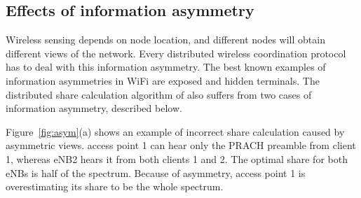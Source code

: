 \subsection{Effects of information asymmetry}
\label{sec:asymmetry}


Wireless sensing depends on node location, and different nodes will obtain different views of the network. 
Every distributed wireless coordination protocol has to deal with this information asymmetry. 
The best known examples of information asymmetries in WiFi are exposed and hidden terminals. 
The distributed share calculation algorithm of \cf also suffers from two cases of information asymmetry, 
described below. 









 Figure~\ref{fig:asym}(a) shows an example of incorrect share calculation caused by asymmetric views. 
access point 1 can hear only the PRACH preamble from client 1, whereas eNB2 hears it from both clients 1 and 2. The optimal share for both eNBs is half of the spectrum. 
Because of asymmetry, access point 1 is overestimating its share to be the whole spectrum.


